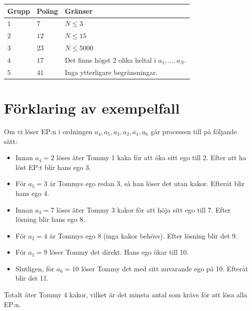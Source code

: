 \noindent
\begin{tabular}{| l | l | p{12cm} |}
  \hline
  \textbf{Grupp} & \textbf{Poäng} & \textbf{Gränser} \\ \hline
  $1$    & $7$        & $N \leq 3$ \\ \hline
  $2$    & $12$       & $N \leq 15$ \\ \hline
  $3$    & $23$       & $N \leq 5000$ \\ \hline
  $4$    & $17$       & Det finns högst 2 olika heltal i $a_1, \dots, a_N$. \\ \hline
  $5$    & $41$       & Inga ytterligare begränsningar. \\ \hline
\end{tabular}

\section*{Förklaring av exempelfall}
Om vi löser EP:n i ordningen $a_4, a_5, a_3, a_2, a_1, a_6$ går processen till på följande sätt:  
\begin{itemize}
 \item Innan $a_4 = 2$ löses äter Tommy 1 kaka för att öka sitt ego till 2. Efter att ha löst EP:t blir hans ego 3.
 \item För $a_5 = 3$ är Tommys ego redan 3, så han löser det utan kakor. Efteråt blir hans ego 4.
 \item Innan $a_3 = 7$ löses äter Tommy 3 kakor för att höja sitt ego till 7. Efter lösning blir hans ego 8.
 \item För $a_2 = 4$ är Tommys ego 8 (inga kakor behövs). Efter lösning blir det 9.
 \item För $a_1 = 9$ löser Tommy det direkt. Hans ego ökar till 10.
 \item Slutligen, för $a_6 = 10$ löser Tommy det med sitt nuvarande ego på 10. Efteråt blir det 11.
\end{itemize}

Totalt äter Tommy 4 kakor, vilket är det minsta antal som krävs för att lösa alla EP:n.
